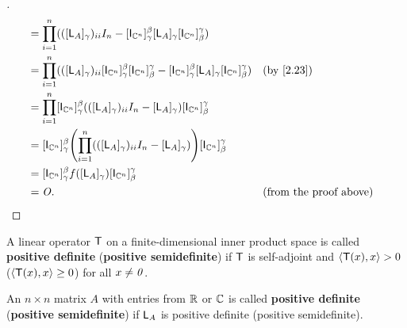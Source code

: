 \begin{proof}[]
\begin{align*}
		     & = \prod_{i = 1}^n (([\L_A]_{\gamma})_{i i} I_n - [\IT[\C^n]]_{\gamma}^{\beta} [\L_A]_{\gamma} [\IT[\C^n]]_{\beta}^{\gamma})                                                                                          \\
		     & = \prod_{i = 1}^n (([\L_A]_{\gamma})_{i i} [\IT[\C^n]]_{\gamma}^{\beta} [\IT[\C^n]]_{\beta}^{\gamma} - [\IT[\C^n]]_{\gamma}^{\beta} [\L_A]_{\gamma} [\IT[\C^n]]_{\beta}^{\gamma}) &  & \by{2.23}                     \\
		     & = \prod_{i = 1}^n [\IT[\C^n]]_{\gamma}^{\beta} (([\L_A]_{\gamma})_{i i} I_n - [\L_A]_{\gamma}) [\IT[\C^n]]_{\beta}^{\gamma}                                                                                          \\
		     & = [\IT[\C^n]]_{\gamma}^{\beta} \pa{\prod_{i = 1}^n (([\L_A]_{\gamma})_{i i} I_n - [\L_A]_{\gamma})} [\IT[\C^n]]_{\beta}^{\gamma}                                                                                     \\
		     & = [\IT[\C^n]]_{\gamma}^{\beta} f([\L_A]_{\gamma}) [\IT[\C^n]]_{\beta}^{\gamma}                                                                                                                                       \\
		     & = \zm.                                                                                                                                                                            &  & \text{(from the proof above)}
	\end{align*}
\end{proof}

\begin{defn}\label{6.4.11}
	A linear operator \(\mathsf{T}\) on a finite-dimensional inner product space is called \textbf{positive definite} (\textbf{positive semidefinite}) if \(\mathsf{T}\) is self-adjoint and \(\left\langle\mathsf{T}(x), x\right\rangle > 0\) (\(\left\langle\mathsf{T}(x), x\right\rangle \geq 0\)) for all \(x \neq \mathit{0}\).

	An \(n \times n\) matrix \(A\) with entries from \(\mathbb{R}\) or \(\mathbb{C}\) is called \textbf{positive definite} (\textbf{positive semidefinite}) if \(\mathsf{L}_A\) is positive definite (positive semidefinite).
\end{defn}

